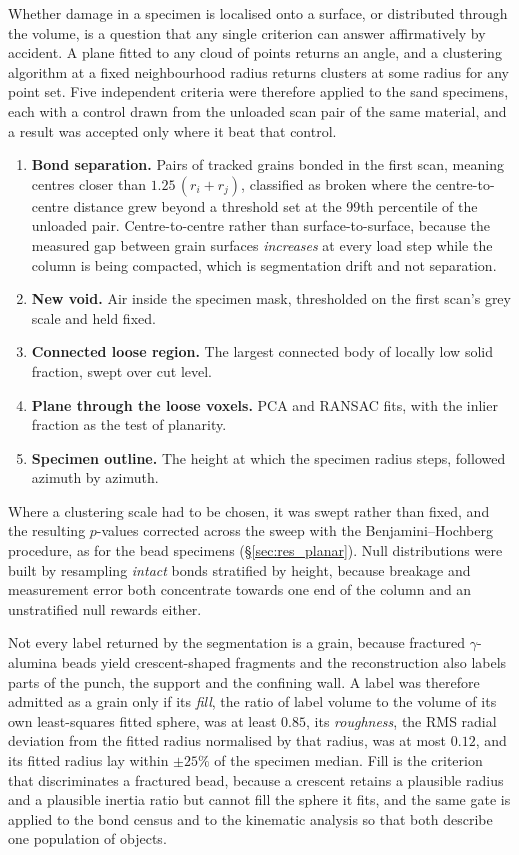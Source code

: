 \documentclass[preprint,12pt,numbers]{elsarticle}
\begin{document}
  Whether damage in a specimen is localised onto a surface, or distributed
  through the volume, is a question that any single criterion can answer
  affirmatively by accident.  A plane fitted to any cloud of points returns an
  angle, and a clustering algorithm at a fixed neighbourhood radius returns
  clusters at some radius for any point set.  Five independent criteria were therefore
  applied to the sand specimens, each with a control drawn from the unloaded
  scan pair of the same material, and a result was accepted only where it beat
  that control.
  \begin{enumerate}\itemsep2pt
    \item \textbf{Bond separation.}  Pairs of tracked grains bonded in the first
      scan, meaning centres closer than $1.25\,(r_i + r_j)$, classified as broken
      where the centre-to-centre distance grew beyond a threshold set at the
      99th percentile of the unloaded pair.  Centre-to-centre rather than
      surface-to-surface, because the measured gap between grain surfaces
      \emph{increases} at every load step while the column is being compacted,
      which is segmentation drift and not separation.
    \item \textbf{New void.}  Air inside the specimen mask, thresholded on the
      first scan's grey scale and held fixed.
    \item \textbf{Connected loose region.}  The largest connected body of
      locally low solid fraction, swept over cut level.
    \item \textbf{Plane through the loose voxels.}  PCA and RANSAC fits, with
      the inlier fraction as the test of planarity.
    \item \textbf{Specimen outline.}  The height at which the specimen radius
      steps, followed azimuth by azimuth.
  \end{enumerate}
  Where a clustering scale had to be chosen, it was swept rather than fixed, and
  the resulting $p$-values corrected across the sweep with the
  Benjamini--Hochberg procedure, as for the bead specimens
  (\S\ref{sec:res_planar}).  Null distributions were built by resampling
  \emph{intact} bonds stratified by height, because breakage and measurement
  error both concentrate towards one end of the column and an unstratified null
  rewards either.

  Not every label returned by the segmentation is a grain, because fractured
  $\gamma$-alumina beads yield crescent-shaped fragments and the reconstruction
  also labels parts of the punch, the support and the confining wall.  A label
  was therefore admitted as a grain only if its \emph{fill}, the ratio of label
  volume to the volume of its own least-squares fitted sphere, was at least
  $0.85$, its \emph{roughness}, the RMS radial deviation from the fitted radius
  normalised by that radius, was at most $0.12$, and its fitted radius lay
  within $\pm25\%$ of the specimen median.  Fill is the criterion that
  discriminates a fractured bead, because a crescent retains a plausible radius
  and a plausible inertia ratio but cannot fill the sphere it fits, and the same
  gate is applied to the bond census and to the kinematic analysis so that both
  describe one population of objects.
\end{document}
